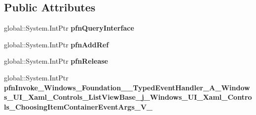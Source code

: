 \subsection*{Public Attributes}
\begin{DoxyCompactItemize}
\item 
\mbox{\label{struct_windows_1_1_foundation_1_1_typed_event_handler___a___windows___u_i___xaml___controls___li81aac31d5f7498ed4eec5cad5e67da4e_ae580e1a8af7df4808ffa6c3f001e2887}} 
global\+::\+System.\+Int\+Ptr {\bfseries pfn\+Query\+Interface}
\item 
\mbox{\label{struct_windows_1_1_foundation_1_1_typed_event_handler___a___windows___u_i___xaml___controls___li81aac31d5f7498ed4eec5cad5e67da4e_ae828621c995052208a839fc1029a78ee}} 
global\+::\+System.\+Int\+Ptr {\bfseries pfn\+Add\+Ref}
\item 
\mbox{\label{struct_windows_1_1_foundation_1_1_typed_event_handler___a___windows___u_i___xaml___controls___li81aac31d5f7498ed4eec5cad5e67da4e_a7168e6a6b5b033436b61f766ef73e21c}} 
global\+::\+System.\+Int\+Ptr {\bfseries pfn\+Release}
\item 
\mbox{\label{struct_windows_1_1_foundation_1_1_typed_event_handler___a___windows___u_i___xaml___controls___li81aac31d5f7498ed4eec5cad5e67da4e_a00ad75fbfe759f9a115ea8e9483f75b1}} 
global\+::\+System.\+Int\+Ptr {\bfseries pfn\+Invoke\+\_\+\+Windows\+\_\+\+Foundation\+\_\+\+\_\+\+Typed\+Event\+Handler\+\_\+\+A\+\_\+\+Windows\+\_\+\+U\+I\+\_\+\+Xaml\+\_\+\+Controls\+\_\+\+List\+View\+Base\+\_\+j\+\_\+\+Windows\+\_\+\+U\+I\+\_\+\+Xaml\+\_\+\+Controls\+\_\+\+Choosing\+Item\+Container\+Event\+Args\+\_\+\+V\+\_\+}
\end{DoxyCompactItemize}
